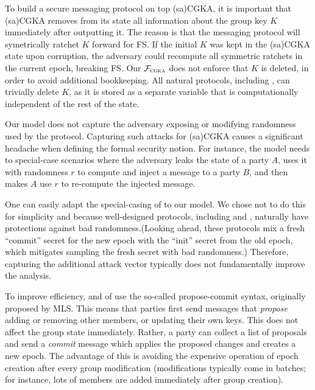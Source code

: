 \begin{description}[itemsep=0pt]
	\item [Deleting group keys] To build a secure messaging protocol on top (sa)CGKA, it is important that (sa)CGKA removes from its state all information about the group key $K$ immediately after outputting it. The reason is that the messaging protocol will symetrically ratchet $K$ forward for FS. If the initial $K$ was kept in the (sa)CGKA state upon corruption, the adversary could recompute all symmetric ratchets in the current epoch, breaking FS.
	Our $\mathcal{F}_{\normalfont\textsc{cgka}}$ does not enforce that $K$ is deleted, in order to avoid additional bookkeeping. All natural protocols, including \saik, can trivially delete $K$, as it is stored as a separate variable that is computationally independent of the rest of the state.
	
	\item [No randomness corruptions]
	Our model does not capture the adversary exposing or modifying randomness used by the protocol.
	Capturing such attacks for (sa)CGKA causes a significant headache when defining the formal security notion. For instance, the model needs to special-case scenarios where the adversary leaks the state of a party $A$, uses it with randomness $r$ to compute and inject a message to a party $B$, and then makes $A$ use $r$ to re-compute the injected message.
	
	One can easily adapt the special-casing of \cite{TCC:ACJM20,EPRINT:AlwJosMul20,hashimoto2021cmpke} to our model. We chose not to do this for simplicity and because well-designed protocols, including \protITK and \saik, naturally have protections against bad randomness.(Looking ahead, these protocols mix a fresh ``commit'' secret for the new epoch with the ``init'' secret from the old epoch, which mitigates sampling the fresh secret with bad randomness.) Therefore, capturing the additional attack vector typically does not fundamentally improve the analysis.
	
	\item [Simplified syntax]
	To improve efficiency, \protITK and \protCMPKE of \cite{hashimoto2021cmpke} use the so-called propose-commit syntax, originally proposed by MLS. This means that parties first send messages that \emph{propose} adding or removing other members, or updating their own keys. This does not affect the group state immediately. Rather, a party can collect a list of proposals and send a \emph{commit} message which applies the proposed changes and creates a new epoch.
	The advantage of this is avoiding the expensive operation of epoch creation after every group modification (modifications typically come in batches; for instance, lots of members are added immediately after group creation).
	

\end{description}
